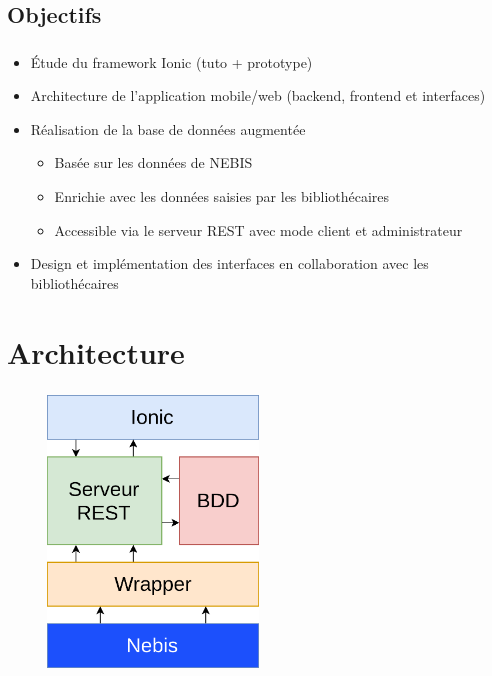 \documentclass[10pt]{beamer}
\begin{document}
\subsection{Objectifs}
\begin{frame}
	\frametitle{\secname}
	\framesubtitle{\subsecname}
    \begin{itemize}
        \item Étude du framework Ionic (tuto + prototype)
        \item Architecture de l'application mobile/web (backend, frontend et interfaces)
        \item Réalisation de la base de données augmentée
        \begin{itemize}
            \item Basée sur les données de NEBIS
            \item Enrichie avec les données saisies par les bibliothécaires
            \item Accessible via le serveur REST avec mode client et administrateur
        \end{itemize}
        \item Design et implémentation des interfaces en collaboration avec les bibliothécaires
    \end{itemize}
\end{frame}

\section{Architecture}
\begin{frame}
	\frametitle{\secname}
	\begin{figure}
		\begin{center}
			\includegraphics[width=0.5\textwidth]{images/architecture_final.png}
		\end{center}
	\end{figure}
\end{frame}
\end{document}
